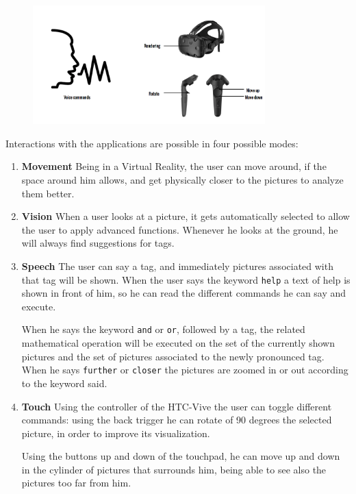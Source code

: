 \documentclass[11pt,a4paper]{article}
\begin{document}
\begin{figure}[H]
  \label{fig:help}
  \centering
  \includegraphics[width=0.8\textwidth]{img/interaction.png}
\end{figure}


Interactions with the applications are possible in four possible modes:
\begin{enumerate}
\item \textbf{Movement} Being in a Virtual Reality, the user can move around, if the space around him allows, and get physically closer to the pictures to analyze them better.

\item \textbf{Vision}
When a user looks at a picture, it gets automatically selected to allow the user to apply advanced functions.
Whenever he looks at the ground, he will always find suggestions for tags.

\item \textbf{Speech} The user can say a tag, and immediately pictures associated with that tag will be shown.
When the user says the keyword \texttt{help} a text of help is shown in front of him, so he can read the different commands he can say and execute.

When he says the keyword \texttt{and} or \texttt{or}, followed by a tag, the related mathematical operation will be executed on the set of the currently shown pictures and the set of pictures associated to the newly pronounced tag.
When he says \texttt{further} or \texttt{closer} the pictures are zoomed in or out according to the keyword said.

\item \textbf{Touch} Using the controller of the HTC-Vive the user can toggle different commands:
using the back trigger he can rotate of 90 degrees the selected picture, in order to improve its visualization.

Using the buttons up and down of the touchpad, he can move up and down in the cylinder of pictures that surrounds him, being able to see also the pictures too far from him.

\end{enumerate}
\end{document}
